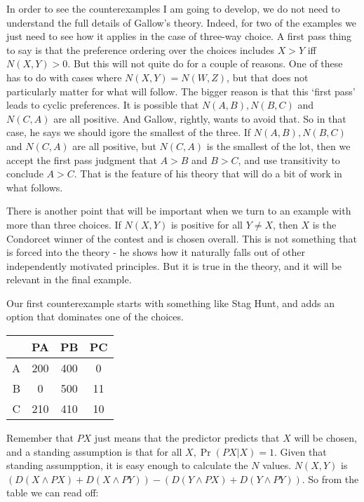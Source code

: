 \documentclass[
  12pt,
]{article}
\begin{document}
In order to see the counterexamples I am going to develop, we do not
need to understand the full details of Gallow's theory. Indeed, for two
of the examples we just need to see how it applies in the case of
three-way choice. A first pass thing to say is that the preference
ordering over the choices includes \(X > Y\) iff \(N(X, Y) > 0\). But
this will not quite do for a couple of reasons. One of these has to do
with cases where \(N(X, Y) = N(W, Z)\), but that does not particularly
matter for what will follow. The bigger reason is that this `first pass'
leads to cyclic preferences. It is possible that \(N(A, B), N(B, C)\)
and \(N(C, A)\) are all positive. And Gallow, rightly, wants to avoid
that. So in that case, he says we should igore the smallest of the
three. If \(N(A, B), N(B, C)\) and \(N(C, A)\) are all positive, but
\(N(C, A)\) is the smallest of the lot, then we accept the first pass
judgment that \(A > B\) and \(B > C\), and use transitivity to conclude
\(A > C\). That is the feature of his theory that will do a bit of work
in what follows.

There is another point that will be important when we turn to an example
with more than three choices. If \(N(X, Y)\) is positive for all
\(Y \neq X\), then \(X\) is the Condorcet winner of the contest and is
chosen overall. This is not something that is forced into the theory -
he shows how it naturally falls out of other independently motivated
principles. But it is true in the theory, and it will be relevant in the
final example.

Our first counterexample starts with something like Stag Hunt, and adds
an option that dominates one of the choices.

\begin{table}[!h]
\centering
\begin{tabular}[t]{>{}r|ccc}
\toprule
 & PA & PB & PC\\
\midrule
A & 200 & 400 & 0\\
B & 0 & 500 & 11\\
C & 210 & 410 & 10\\
\bottomrule
\end{tabular}
\end{table}

Remember that \(PX\) just means that the predictor predicts that \(X\)
will be chosen, and a standing assumption is that for all
\(X, \Pr(PX | X) = 1\). Given that standing assumpption, it is easy
enough to calculate the \(N\) values. \(N(X, Y)\) is
\((D(X \wedge PX) + D(X \wedge PY)) - (D(Y \wedge PX) + D(Y \wedge PY))\).
So from the table we can read off:
\end{document}
